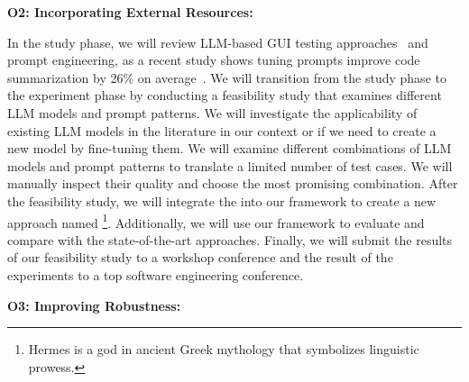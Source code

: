 

\smallskip
\noindent
\textbf{O2: Incorporating External Resources:}  

\noindent
In the study phase, we will review LLM-based GUI testing approaches~\cite{Zimmermann:GPT3GUITest:2023:ICSTW, liu:GUIInputLLM:ICSE:2023} and prompt engineering, as a recent study shows tuning prompts improve code summarization  by 26\% on average~\cite{wang:prompt:FSE:2023}.
We will transition from the study phase to the experiment phase by conducting a feasibility study that examines different LLM models and prompt patterns.
We will investigate the applicability of existing LLM models in the literature in our context or if we need to create a new model by fine-tuning them.
We will examine different combinations of LLM models and prompt patterns to translate a limited number of test cases.
We will manually inspect their quality and choose the most promising combination.
After the feasibility study, we will integrate the \llmtranslator into our framework to create a new \testreuse approach named \llmtool\footnote{Hermes is a god in ancient Greek mythology that symbolizes linguistic prowess.}.
Additionally, we will use our \tme framework to evaluate \llmtool and compare with the state-of-the-art \testreuse approaches.
Finally, we will submit the results of our  feasibility study to a workshop conference and the result of the \testreuse experiments to a top software engineering conference. 




\smallskip
\noindent
\textbf{O3: Improving Robustness:}  

